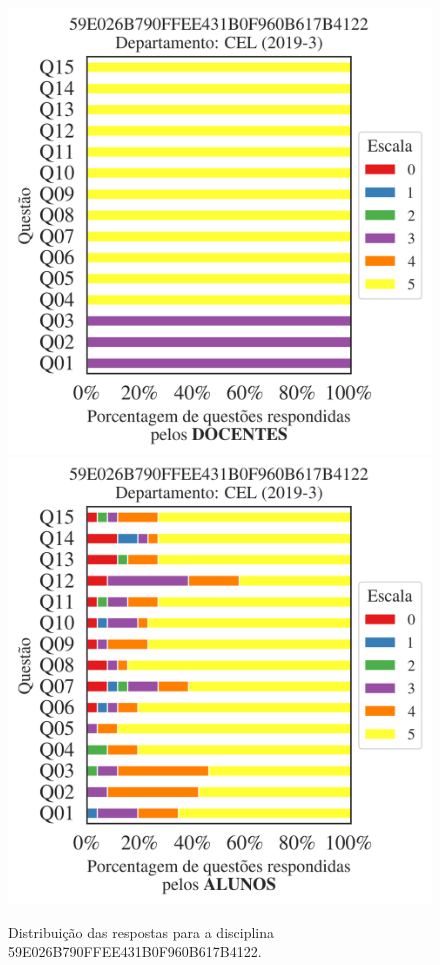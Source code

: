 \documentclass[a4paper,10pt]{article}
\begin{document}
\begin{figure}[h]
\centering
\includegraphics[width=0.485\linewidth]{analise_disciplina_departamento_CEL_59E026B790FFEE431B0F960B617B4122_docentes.png}
\includegraphics[width=0.485\linewidth]{analise_disciplina_departamento_CEL_59E026B790FFEE431B0F960B617B4122_alunos.png}
\caption{\label{fig:analise_geral_departamento}                Distribuição das respostas para a disciplina 59E026B790FFEE431B0F960B617B4122. }
\end{figure}
\end{document}
